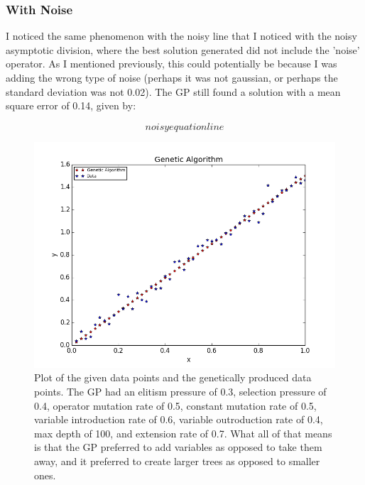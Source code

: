 \documentclass[11pt,amsmath,amssymb]{revtex4}
\begin{document}
\subsubsection{With Noise}
I noticed the same phenomenon with the noisy line that I noticed with the noisy asymptotic division, where the best solution generated did not include the 'noise' operator. As I mentioned previously, this could potentially be because I was adding the wrong type of noise (perhaps it was not gaussian, or perhaps the standard deviation was not 0.02). The GP still found a solution with a mean square error of 0.14, given by:

\begin{equation}
noisy equation line
\end{equation}

\begin{figure}[H]
\center
\includegraphics[scale=0.55]{Line_With_Noise.png}
\caption{Plot of the given data points and the genetically produced data points. The GP had an elitism pressure of 0.3, selection pressure of 0.4, operator mutation rate of 0.5, constant mutation rate of 0.5, variable introduction rate of 0.6, variable outroduction rate of 0.4, max depth of 100, and extension rate of 0.7. What all of that means is that the GP preferred to add variables as opposed to take them away, and it preferred to create larger trees as opposed to smaller ones.}
\label{q1}
\end{figure}
\end{document}

